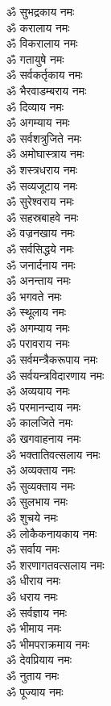 \begin{center}
\begin{multicols}{2}
\begin{flushleft}
ॐ सुभद्रकाय नमः\hfill{}\\
ॐ करालाय नमः\\
ॐ विकरालाय नमः\\
ॐ गतायुषे नमः\\
ॐ सर्वकर्तृकाय नमः\\
ॐ भैरवाडम्बराय नमः\\
ॐ दिव्याय नमः\\
ॐ अगम्याय नमः\\
ॐ सर्वशत्रुजिते नमः\\
ॐ अमोघास्त्राय नमः\\
ॐ शस्त्रधराय नमः\hfill{}\\
ॐ सव्यजूटाय नमः\\
ॐ सुरेश्वराय नमः\\
ॐ सहस्रबाहवे नमः\\
ॐ वज्रनखाय नमः\\
ॐ सर्वसिद्धये नमः\\
ॐ जनार्दनाय नमः\\
ॐ अनन्ताय नमः\\
ॐ भगवते नमः\\
ॐ स्थूलाय नमः\\
ॐ अगम्याय नमः\hfill{}\\
ॐ परावराय नमः\\
ॐ सर्वमन्त्रैकरूपाय नमः\\
ॐ सर्वयन्त्रविदारणाय नमः\\
ॐ अव्ययाय नमः\\
ॐ परमानन्दाय नमः\\
ॐ कालजिते नमः\\
ॐ खगवाहनाय नमः\\
ॐ भक्तातिवत्सलाय नमः\\
ॐ अव्यक्ताय नमः\\
ॐ सुव्यक्ताय नमः\hfill{}\\
ॐ सुलभाय नमः\\
ॐ शुचये नमः\\
ॐ लोकैकनायकाय नमः\\
ॐ सर्वाय नमः\\
ॐ शरणागतवत्सलाय नमः\\
ॐ धीराय नमः\\
ॐ धराय नमः\\
ॐ सर्वज्ञाय नमः\\
ॐ भीमाय नमः\\
ॐ भीमपराक्रमाय नमः\hfill{}\\
ॐ देवप्रियाय नमः\\
ॐ नुताय नमः\\
ॐ पूज्याय नमः\\

\end{flushleft}
\end{multicols}
\end{center}

